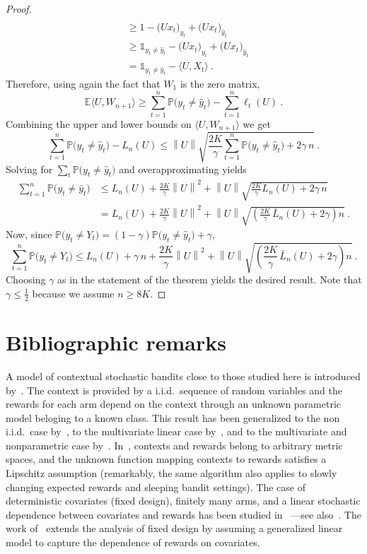 \documentclass[11pt]{hackednow}
\renewcommand{\P}{\mathbb{P}}
\newcommand{\E}{\mathbb{E}}
\def\ds1{\mathds{1}}
\newcommand{\wh}{\widehat}
\newcommand{\inner}[2]{\bigl\langle{#1},{#2}\bigr\rangle}
\newcommand{\norm}[1]{\left\|{#1}\right\|}
\newcommand{\yhat}{\wh{y}}
\begin{document}
\begin{proof}
\begin{align*}
\\ &\ge
    1 - \bigl(Ux_t\bigr)_{y_t} + \bigl(Ux_t\bigr)_{\yhat_t}
\\ &\ge
    \ds1_{y_t \neq \yhat_t} - \bigl(Ux_t\bigr)_{y_t} + \bigl(Ux_t\bigr)_{\yhat_t}
\\ &=
    \ds1_{y_t \neq \yhat_t} - \inner{U}{X_t}~.
\end{align*}
Therefore, using again the fact that $W_1$ is the zero matrix,
\[
    \E\inner{U}{W_{n+1}} \ge \sum_{t=1}^n \P\bigl(y_t \neq \yhat_t\bigr) - \sum_{t=1}^n \ell_t(U)~.
\]
Combining the upper and lower bounds on $\inner{U}{W_{n+1}}$ we get
\[
    \sum_{t=1}^n \P\bigl(y_t \neq \yhat_t\bigr) - L_n(U)
\le
    \norm{U}\sqrt{\frac{2K}{\gamma}\sum_{t=1}^n \P\bigl(y_t \neq \yhat_t\bigr) + 2\gamma\,n}~.
\]
Solving for $\sum_t \P\bigl(y_t \neq \yhat_t\bigr)$ and overapproximating yields
\begin{align*}
    \sum_{t=1}^n \P\bigl(y_t \neq \yhat_t\bigr)
&\le
    L_n(U) + \frac{2K}{\gamma}\norm{U}^2 + \norm{U}\sqrt{\frac{2K}{\gamma} L_n(U) + 2\gamma\,n}
\\ &=
    L_n(U) + \frac{2K}{\gamma}\norm{U}^2 + \norm{U}\sqrt{\left(\frac{2K}{\gamma}\,\bar{L}_n(U) + 2\gamma\right)n}~.
\end{align*}
Now, since $\P\bigl(y_t \neq Y_t\bigr) = (1-\gamma)\P\bigl(y_t \neq \yhat_t\bigr) + \gamma$,
\[
    \sum_{t=1}^n \P\bigl(y_t \neq Y_t\bigr)
\le
    L_n(U) + \gamma\,n + \frac{2K}{\gamma}\norm{U}^2 + \norm{U}\sqrt{\left(\frac{2K}{\gamma}\,\bar{L}_n(U) + 2\gamma\right)n}~.
\]
Choosing $\gamma$ as in the statement of the theorem yields the desired result.
Note that $\gamma \le \tfrac{1}{2}$ because we assume $n \ge 8K$.
\end{proof}


\section{Bibliographic remarks} \label{sec:contextual}
%
A model of contextual stochastic bandits close to those studied here is introduced by~\cite{wang2005bandit}. The context is provided by a i.i.d.\ sequence of random variables and the rewards for each arm depend on the context through an unknown parametric model beloging to a known class. This result has been generalized to the non i.i.d.\ case by~\cite{wang2005arbitrary}, to the multivariate linear case by~\cite{RT10}, and to the multivariate and nonparametric case by~\cite{PR11}. In~\cite{slivkins2009contextual}, contexts and rewards belong to arbitrary metric spaces, and the unknown function mapping contexts to rewards satisfies a Lipschitz assumption (remarkably, the same algorithm also applies to slowly changing expected rewards and sleeping bandit settings). The case of deterministic covariates (fixed design), finitely many arms, and a linear stochastic dependence between covariates and rewards has been studied in~\cite{Aue02,chu2011contextual} ---see also~\cite{abe1999associative}. The work of~\cite{filippi2010parametric} extends the analysis of fixed design by assuming a generalized linear model to capture the dependence of rewards on covariates.
\end{document}
